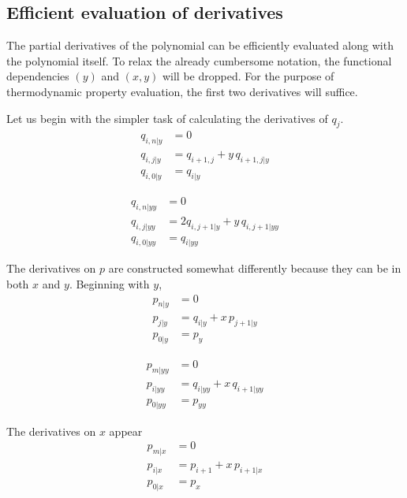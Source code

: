 \documentclass[twocolumn,letterpaper,11pt]{article}
\begin{document}
\subsection{Efficient evaluation of derivatives}
The partial derivatives of the polynomial can be efficiently evaluated along with the polynomial itself. To relax the already cumbersome notation, the functional dependencies $(y)$ and $(x,y)$ will be dropped.  For the purpose of thermodynamic property evaluation, the first two derivatives will suffice.

Let us begin with the simpler task of calculating the derivatives of $q_j$.
\begin{subequations}
\begin{align}
q_{i,n|y} &= 0\\
q_{i,j|y} &= q_{i+1,j} + y\,q_{i+1,j|y}\\
q_{i,0|y} &= q_{i|y}
\end{align}
\end{subequations}

\begin{subequations}
\begin{align}
q_{i,n|yy} &= 0\\
q_{i,j|yy} &= 2 q_{i,j+1|y} + y\,q_{i,j+1|yy}\\
q_{i,0|yy} &= q_{i|yy}
\end{align}
\end{subequations}

The derivatives on $p$ are constructed somewhat differently because they can be in both $x$ and $y$.  Beginning with $y$,
\begin{subequations}
\begin{align}
p_{n|y} &= 0\\
p_{j|y} &= q_{i|y} + x\,p_{j+1|y}\\
p_{0|y} &= p_y
\end{align}
\end{subequations}

\begin{subequations}
\begin{align}
p_{m|yy} &= 0\\
p_{i|yy} &= q_{i|yy} + x\,q_{i+1|yy}\\
p_{0|yy} &= p_{yy}
\end{align}
\end{subequations}

The derivatives on $x$ appear
\begin{subequations}
\begin{align}
p_{m|x} &= 0\\
p_{i|x} &= p_{i+1} + x\,p_{i+1|x}\\
p_{0|x} &= p_x
\end{align}
\end{subequations}
\end{document}

